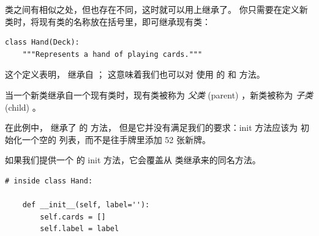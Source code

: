 
类之间有相似之处，但也存在不同，这时就可以用上继承了。  
你只需要在定义新类时，将现有类的名称放在括号里，即可继承现有类：


\begin{lstlisting}
class Hand(Deck):
    """Represents a hand of playing cards."""
\end{lstlisting}


这个定义表明， 继承自  ；  这意味着我们也可以对  使用  的  和  方法。


当一个新类继承自一个现有类时，现有类被称为 {\em 父类} (parent) ，新类被称为 {\em 子类} (child) 。



在此例中，  继承了  的  方法， 
但是它并没有满足我们的要求：init 方法应该为  初始化一个空的  
列表，而不是往手牌里添加 52 张新牌。



如果我们提供一个  的 init 方法，它会覆盖从  类继承来的同名方法。

\begin{lstlisting}
# inside class Hand:

    def __init__(self, label=''):
        self.cards = []
        self.label = label
\end{lstlisting}

